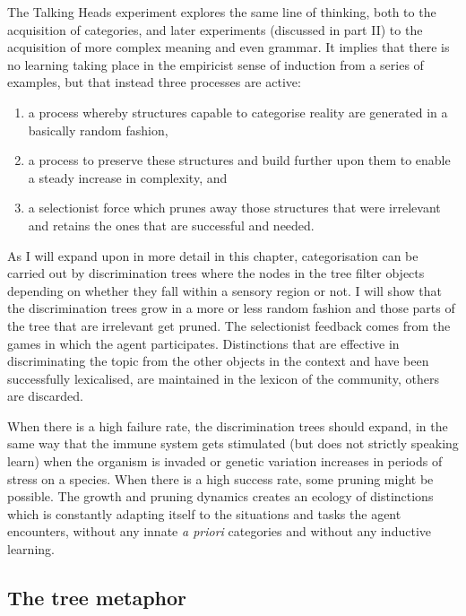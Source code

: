 The Talking Heads experiment explores the same line of thinking, 
both to the acquisition of categories, and later experiments 
(discussed in part II) to the acquisition of more complex meaning 
and even grammar. It implies
that there is no learning taking place in the empiricist sense 
of induction from a series of examples, but that instead 
three processes are active: 
\begin{enumerate}
\item a process whereby structures capable to categorise
reality are generated in a basically random fashion, 
\item a process to preserve these structures and build 
further upon them to enable a steady increase in 
complexity, and 
\item a selectionist force which
prunes away those structures that were irrelevant and 
retains the ones that are successful and needed. 
\end{enumerate}

As I will expand upon in more detail in this 
chapter, categorisation
can be carried out by discrimination trees where the 
nodes in the tree filter objects depending on whether they 
fall within a sensory region or not. I will show that
the discrimination trees grow in a more or
less random fashion and 
those parts of the tree that are irrelevant get pruned. 
The selectionist feedback comes from the games in which 
the agent participates. Distinctions that are effective
in discriminating the topic from the other objects in 
the context and have been successfully lexicalised, 
are maintained in the lexicon of the
community, others are discarded.

When there is a high failure rate, the discrimination trees 
should expand, in the same way that the immune system gets 
stimulated (but does not strictly speaking
learn) when the organism is
invaded or genetic variation increases in periods
of stress on a species. When there is a high
success rate, some pruning
might be possible. The growth and pruning dynamics creates an 
ecology of distinctions which is constantly 
adapting itself to the situations and tasks 
the agent encounters, without any innate {\itshape a priori}
categories and without any inductive learning. 

\subsection{The tree metaphor}

